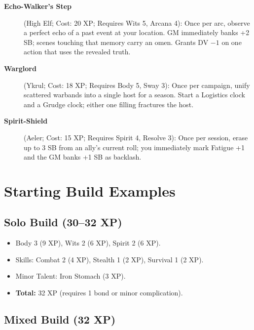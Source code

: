 \begin{description}
\item[\textbf{Echo-Walker's Step}] (High Elf; Cost: 20 XP; Requires Wits 5, Arcana 4): Once per arc, observe a perfect echo of a past event at your location. GM immediately banks +2 SB; scenes touching that memory carry an omen. Grants DV $-1$ on one action that uses the revealed truth.
\item[\textbf{Warglord}] (Ykrul; Cost: 18 XP; Requires Body 5, Sway 3): Once per campaign, unify scattered warbands into a single host for a season. Start a Logistics clock and a Grudge clock; either one filling fractures the host.
\item[\textbf{Spirit-Shield}] (Aeler; Cost: 15 XP; Requires Spirit 4, Resolve 3): Once per session, erase up to 3 SB from an ally's current roll; you immediately mark Fatigue +1 and the GM banks +1 SB as backlash.
\end{description}

\section{Starting Build Examples}
\label{sec:starting-examples}

\subsection{Solo Build (30--32 XP)}
\label{subsec:solo-example}

\begin{itemize}
\item Body 3 (9 XP), Wits 2 (6 XP), Spirit 2 (6 XP).
\item Skills: Combat 2 (4 XP), Stealth 1 (2 XP), Survival 1 (2 XP).
\item Minor Talent: Iron Stomach (3 XP).
\item \textbf{Total:} 32 XP (requires 1 bond or minor complication).
\end{itemize}

\subsection{Mixed Build (32 XP)}
\label{subsec:mixed-example}

